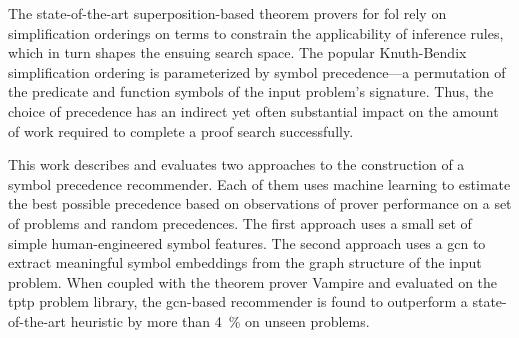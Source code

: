 The state-of-the-art superposition-based theorem provers for \acrlong{fol} rely on simplification orderings on terms to constrain the applicability of inference rules,
which in turn shapes the ensuing search space.
The popular Knuth-Bendix simplification ordering is parameterized by symbol precedence—a permutation of the predicate and function symbols of the input problem’s signature.
Thus, the choice of precedence has an indirect yet often substantial impact on the amount of work required to complete a proof search successfully.

This work describes and evaluates two approaches to the construction of a symbol precedence recommender.
Each of them uses machine learning to estimate the best possible precedence based on observations of prover performance on a set of problems and random precedences.
The first approach uses a small set of simple human-engineered symbol features.
The second approach uses a \acrfull{gcn} to extract meaningful symbol embeddings from the graph structure of the input problem.
When coupled with the theorem prover Vampire and evaluated on the \acrshort{tptp} problem library, the \acrshort{gcn}-based recommender is found to outperform a state-of-the-art heuristic by more than \SI{4}{\percent} on unseen problems.
